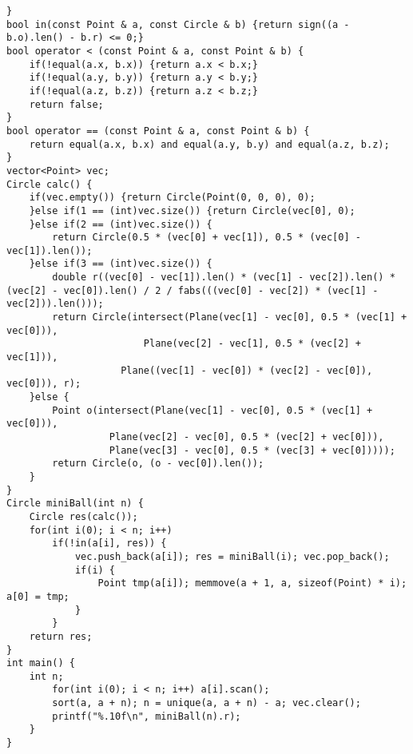 \documentclass[landscape,a4paper]{article}
\begin{document}
\begin{spacing}{0.3}
\begin{multicols}{3}
\begin{lstlisting}
}
bool in(const Point & a, const Circle & b) {return sign((a - b.o).len() - b.r) <= 0;}	
bool operator < (const Point & a, const Point & b) {
	if(!equal(a.x, b.x)) {return a.x < b.x;}
	if(!equal(a.y, b.y)) {return a.y < b.y;}
	if(!equal(a.z, b.z)) {return a.z < b.z;}
	return false;
}
bool operator == (const Point & a, const Point & b) {
	return equal(a.x, b.x) and equal(a.y, b.y) and equal(a.z, b.z);
}
vector<Point> vec;
Circle calc() {
	if(vec.empty()) {return Circle(Point(0, 0, 0), 0);
	}else if(1 == (int)vec.size()) {return Circle(vec[0], 0);
	}else if(2 == (int)vec.size()) {
		return Circle(0.5 * (vec[0] + vec[1]), 0.5 * (vec[0] - vec[1]).len());
	}else if(3 == (int)vec.size()) {
		double r((vec[0] - vec[1]).len() * (vec[1] - vec[2]).len() * (vec[2] - vec[0]).len() / 2 / fabs(((vec[0] - vec[2]) * (vec[1] - vec[2])).len()));
		return Circle(intersect(Plane(vec[1] - vec[0], 0.5 * (vec[1] + vec[0])),
				       	Plane(vec[2] - vec[1], 0.5 * (vec[2] + vec[1])),
					Plane((vec[1] - vec[0]) * (vec[2] - vec[0]), vec[0])), r);
	}else {
		Point o(intersect(Plane(vec[1] - vec[0], 0.5 * (vec[1] + vec[0])),
				  Plane(vec[2] - vec[0], 0.5 * (vec[2] + vec[0])),
				  Plane(vec[3] - vec[0], 0.5 * (vec[3] + vec[0]))));
		return Circle(o, (o - vec[0]).len());
	}
}
Circle miniBall(int n) {
	Circle res(calc());
	for(int i(0); i < n; i++)
		if(!in(a[i], res)) {
			vec.push_back(a[i]); res = miniBall(i); vec.pop_back();
			if(i) {
				Point tmp(a[i]); memmove(a + 1, a, sizeof(Point) * i); a[0] = tmp;
			}
		}
	return res;
}
int main() {
	int n;
		for(int i(0); i < n; i++) a[i].scan();
		sort(a, a + n); n = unique(a, a + n) - a; vec.clear();
		printf("%.10f\n", miniBall(n).r);
	}
}
\end{lstlisting}

\end{multicols}
\end{spacing}
\end{document}
